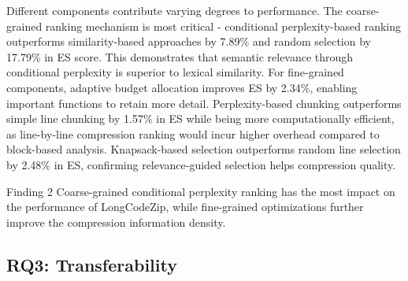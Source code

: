 \documentclass[10pt,conference]{IEEEtran}
\newcommand{\approach}{{LongCodeZip}\xspace} %
\begin{document}
Different components contribute varying degrees to performance. The coarse-grained ranking mechanism is most critical - conditional perplexity-based ranking outperforms similarity-based approaches by 7.89\% and random selection by 17.79\% in ES score. This demonstrates that semantic relevance through conditional perplexity is superior to lexical similarity. For fine-grained components, adaptive budget allocation improves ES by 2.34\%, enabling important functions to retain more detail. Perplexity-based chunking outperforms simple line chunking by 1.57\% in ES while being more computationally efficient, as line-by-line compression ranking would incur higher overhead compared to block-based analysis. Knapsack-based selection outperforms random line selection by 2.48\% in ES, confirming relevance-guided selection helps compression quality.

\begin{finding}{Finding 2}
    Coarse-grained conditional perplexity ranking has the most impact on the performance of LongCodeZip, while fine-grained optimizations further improve the compression information density.
\end{finding}

\subsection{RQ3: Transferability}

\begin{table}[t]
    \centering
    \caption{Cross-model Results}
    \label{tab:cross_model}
\end{table}
\end{document}
